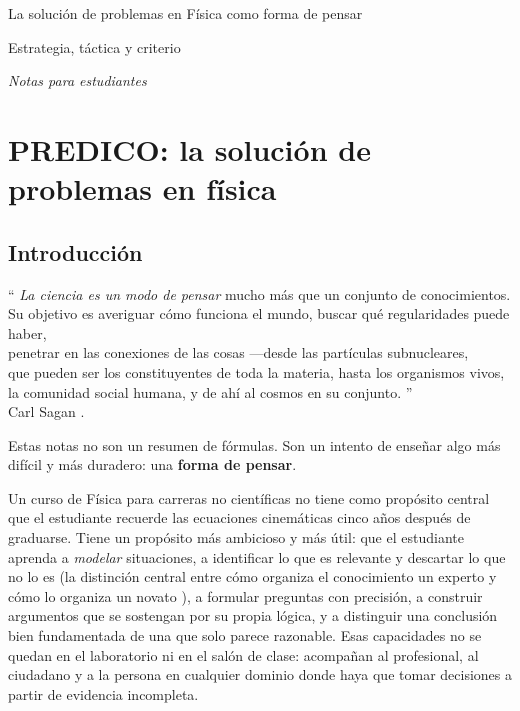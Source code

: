 \documentclass[11pt]{book}
\begin{document}
\frontmatter

\centerline{\Large La solución de problemas en Física como forma de pensar}
\centerline{\large Estrategia, táctica y criterio}
\centerline{\normalsize\it Notas para estudiantes}
\bigskip

{\small\tableofcontents}
\newpage

\mainmatter
\chapter{PREDICO: la solución de problemas en física}
\label{ch:predico}

\section*{Introducción}

{\small
\begin{flushright}
	``
	{\it La ciencia es un modo de pensar} mucho más que un conjunto de conocimientos.\\
	Su objetivo es averiguar cómo funciona el mundo, buscar qué regularidades puede haber,\\
	penetrar en las conexiones de las cosas ---desde las partículas subnucleares,\\
	que pueden ser los constituyentes de toda la materia, hasta los organismos vivos,\\
	la comunidad social humana, y de ahí al cosmos en su conjunto.
	''\\
	Carl Sagan \cite{Sagan1979}.
\end{flushright}
}

\medskip
Estas notas no son un resumen de fórmulas. Son un intento de enseñar algo más difícil y más duradero: una {\bf forma de pensar}.

Un curso de Física para carreras no científicas no tiene como propósito central que el estudiante recuerde las ecuaciones cinemáticas cinco años después de graduarse. Tiene un propósito más ambicioso y más útil: que el estudiante aprenda a {\it modelar} situaciones, a identificar lo que es relevante y descartar lo que no lo es (la distinción central entre cómo organiza el conocimiento un experto y cómo lo organiza un novato \cite{Mestre2020}), a formular preguntas con precisión, a construir argumentos que se sostengan por su propia lógica, y a distinguir una conclusión bien fundamentada de una que solo parece razonable. Esas capacidades no se quedan en el laboratorio ni en el salón de clase: acompañan al profesional, al ciudadano y a la persona en cualquier dominio donde haya que tomar decisiones a partir de evidencia incompleta.
\end{document}
